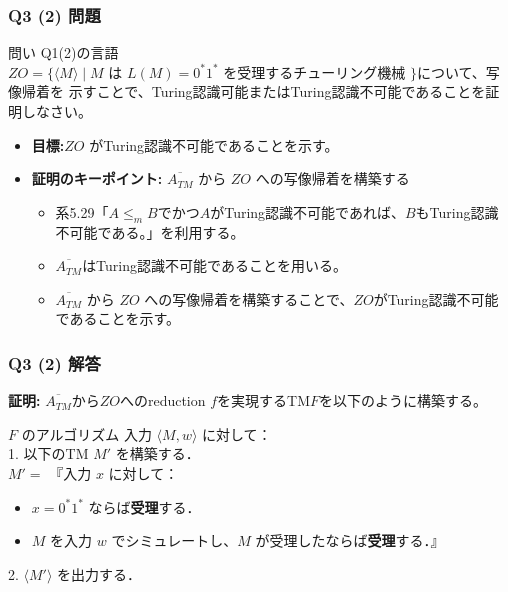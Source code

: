 \begin{frame}[fragile]
\frametitle{Q3 (2) 問題}
\begin{alertblock}{問い}
    Q1(2)の言語$ZO = \{\langle M \rangle \mid M \text{ は } L(M) = 0^*1^* \text{ を受理するチューリング機械 } \}$について、写像帰着を
    示すことで、Turing認識可能またはTuring認識不可能であることを証明しなさい。
\end{alertblock}
\begin{itemize}
    \item \textbf{目標:}$ZO$ がTuring認識不可能であることを示す。
    \item \textbf{証明のキーポイント:} \alert{$\overline{A_{TM}}$ から $ZO$ への写像帰着を構築する}
    \begin{itemize}
        \item 系5.29「$A \le_m B$でかつ$A$がTuring認識不可能であれば、$B$もTuring認識不可能である。」を利用する。
        \item $\overline{A_{TM}}$はTuring認識不可能であることを用いる。
        \item $\overline{A_{TM}}$ から $ZO$ への写像帰着を構築することで、$ZO$がTuring認識不可能であることを示す。  
    \end{itemize}
\end{itemize}
\end{frame}

\begin{frame}[fragile]
\frametitle{Q3 (2) 解答}
\textbf{証明:}
$\overline{A_{TM}}$から$ZO$へのreduction $f$を実現するTM$F$を以下のように構築する。

\begin{block}{$F$ のアルゴリズム}
  入力 $\langle M, w \rangle$ に対して：\\
  1. 以下のTM $M'$ を構築する．\\
  \quad $M'=$ 『入力 $x$ に対して：
  \begin{itemize}
      \item $x = 0^*1^*$ ならば\textbf{受理}する．
      \item $M$ を入力 $w$ でシミュレートし、$M$ が受理したならば\textbf{受理}する．』
  \end{itemize}
  2. $\langle M' \rangle$ を出力する．
\end{block}


\end{frame}

